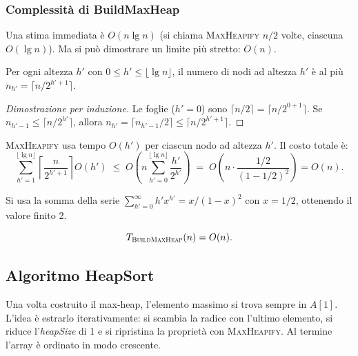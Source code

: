 \subsubsection{Complessità di BuildMaxHeap}

\begin{softnote}
	Una stima immediata è $O(n \lg n)$ (si chiama \textsc{MaxHeapify}
	$n/2$ volte, ciascuna $O(\lg n)$). Ma si può dimostrare un limite
	più stretto: $O(n)$.
\end{softnote}

Per ogni altezza $h'$ con $0 \le h' \le \lfloor \lg n \rfloor$,
il numero di nodi ad altezza $h'$ è al più
$n_{h'} = \lceil n / 2^{h'+1} \rceil$.

\begin{proof}[Dimostrazione per induzione]
	Le foglie ($h'=0$) sono $\lceil n/2 \rceil = \lceil n/2^{0+1} \rceil$.
	Se $n_{h'-1} \le \lceil n/2^{h'} \rceil$, allora
	$n_{h'} = \lceil n_{h'-1}/2 \rceil \le \lceil n/2^{h'+1} \rceil$.
\end{proof}

\textsc{MaxHeapify} usa tempo $O(h')$ per ciascun nodo ad altezza
$h'$. Il costo totale è:
\[
\sum_{h'=1}^{\lfloor \lg n \rfloor}
\left\lceil \frac{n}{2^{h'+1}} \right\rceil O(h')
\;\le\;
O\!\left(n \sum_{h'=0}^{\lfloor \lg n \rfloor} \frac{h'}{2^{h'}}
\right)
\;=\;
O\!\left(n \cdot \frac{1/2}{(1-1/2)^2}\right)
= O(n).
\]

\begin{nota}
	Si usa la somma della serie $\sum_{h'=0}^{\infty} h' x^{h'} =
	x/(1-x)^2$ con $x = 1/2$, ottenendo il valore finito 2.
\end{nota}

\begin{teorema}
	\[
	T_{\textsc{BuildMaxHeap}}(n) = O(n).
	\]
\end{teorema}
\newpage

\subsection{Algoritmo HeapSort}

\begin{softnote}
	Una volta costruito il max-heap, l'elemento massimo si trova sempre
	in $A[1]$. L'idea è estrarlo iterativamente: si scambia la radice con
	l'ultimo elemento, si riduce l'\textit{heapSize} di 1 e si ripristina
	la proprietà con \textsc{MaxHeapify}. Al termine l'array è ordinato in
	modo crescente.
\end{softnote}

